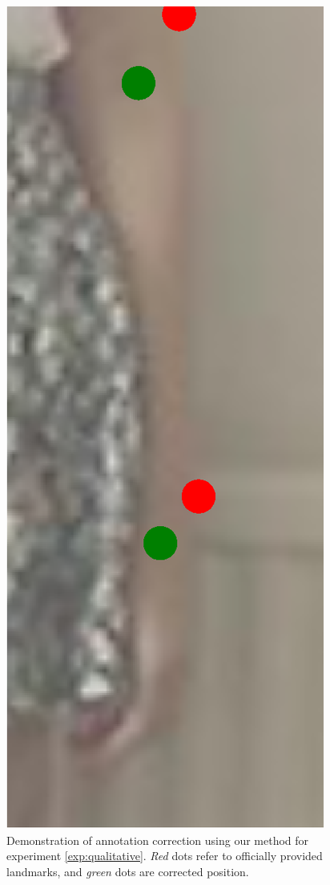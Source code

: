 \begin{figure}[!t]
    \hfill
    \includegraphics[height=\fh]{resources/Fixing/fix_18}
    \caption{Demonstration of annotation correction using our method for experiment \ref{exp:qualitative}. \emph{Red} dots refer to officially provided landmarks, and \emph{green} dots are corrected position.}
    \label{fig:qualitative}
\end{figure}

